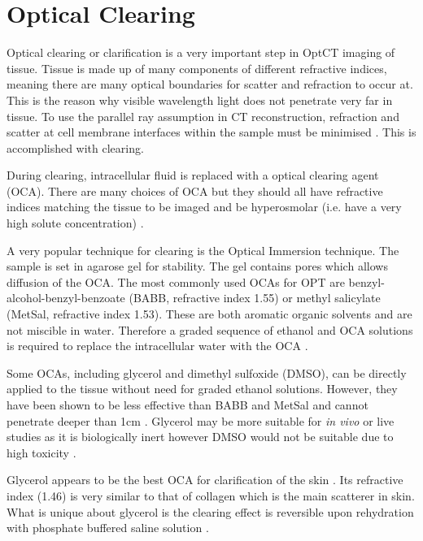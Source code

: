 \section{Optical Clearing}
\label{sec:clearing}

Optical clearing or clarification is a very important step in OptCT imaging of tissue. Tissue is made up of many components of different refractive indices, meaning there are many optical boundaries for scatter and refraction to occur at. This is the reason why visible wavelength light does not penetrate very far in tissue. To use the parallel ray assumption  in CT reconstruction, refraction and scatter at cell membrane interfaces within the sample must be minimised \cite{Oldham:2006}.  This is accomplished with clearing.

During clearing, intracellular  fluid is replaced with a optical clearing agent (OCA). There are many choices of OCA but they should all have refractive indices matching the tissue to be imaged and be hyperosmolar (i.e. have a very high solute concentration) \cite{tuchin2007tissue}.
 
 
A very popular technique for clearing is the Optical Immersion technique. The sample is set in agarose gel for stability. The gel contains pores which allows diffusion of the OCA. The most commonly used OCAs for OPT are benzyl-alcohol-benzyl-benzoate (BABB, refractive index 1.55) or methyl salicylate (MetSal, refractive index 1.53). These are both aromatic organic solvents and are not miscible in water. Therefore a graded sequence of ethanol and OCA solutions is required to replace the intracellular water with the OCA \cite{Oldham:2006}. 

Some OCAs, including glycerol and dimethyl sulfoxide (DMSO), can be directly applied to the tissue without need for graded ethanol solutions. However, they have been shown to be less effective than BABB and MetSal and cannot penetrate deeper than 1cm \cite{Oldham:2006}.  Glycerol may be more suitable for \textit{in vivo} or live studies as it is biologically inert however DMSO would not be suitable due to high toxicity \cite{Wen:2009is}.


Glycerol appears to be the best OCA for clarification of the skin \cite{Vargas:1999, Wen:2009is}. Its refractive index (1.46) is very similar to that of collagen which is the main scatterer in skin. What is unique about glycerol is the clearing effect is reversible upon rehydration with phosphate buffered saline solution \cite{Vargas:1999}. 


